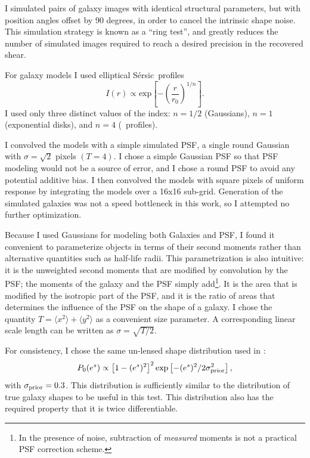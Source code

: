 \documentclass[12pt,preprint]{aastex}
\newcommand{\sersic}{S\'{e}rsic}
\begin{document}
I simulated pairs of galaxy images with identical structural parameters, but
with position angles offset by 90 degrees, in order to cancel the intrinsic
shape noise.  This simulation strategy is known as a ``ring
test''\citep{Nakajima2007}, and greatly reduces the number of simulated images
required to reach a desired precision in the recovered shear.

For galaxy models I used elliptical \sersic\ profiles \citep{Sersic63}
\begin{equation}
I(r) \varpropto \mathrm{exp} \left[ -\left( \frac{r}{r_0} \right)^{1/n} \right].
\end{equation}
I used only three distinct values of the index: $n=1/2$ (Gaussians), $n=1$ (exponential
disks), and $n=4$ (\devauc\ profiles).

I convolved the models with a simple simulated PSF, a single round Gaussian
with $\sigma = \sqrt{2}$ pixels $(T=4)$.  I chose a simple Gaussian PSF so that
PSF modeling would not be a source of error, and I chose a round PSF to avoid
any potential additive bias.  I then convolved the models with square pixels of
uniform response by integrating the models over a 16x16 sub-grid.  Generation
of the simulated galaxies was not a speed bottleneck in this work, so I
attempted no further optimization.

Because I used Gaussians for modeling both Galaxies and PSF, I found it
convenient to parameterize objects in terms of their second moments rather than
alternative quantities such as half-life radii.  This parametrization is also
intuitive: it is the unweighted second moments that are modified by convolution
by the PSF; the moments of the galaxy and the PSF simply add\footnote{In the
presence of noise, subtraction of {\it measured} moments is not a practical PSF
correction scheme.}.  It is the area that is modified by the isotropic part of
the PSF, and it is the ratio of areas that determines the influence of the PSF
on the shape of a galaxy.  I chose the quantity $T = \langle x^2 \rangle +
\langle y^2 \rangle$ as a convenient size parameter.  A corresponding linear
scale length can be written as $\sigma = \sqrt{T/2}$.

For consistency, I chose the same un-lensed shape distribution
used in \cite{ba14}:
\begin{equation}
P_0(e^s)\propto \left[1-(e^s)^2\right]^2 \exp\left[-(e^s)^2/2\sigma_{\rm prior}^2\right],
\end{equation}
with $\sigma_{\rm prior}=0.3$. This distribution is sufficiently similar to the
distribution of true galaxy shapes to be useful in this test.  This
distribution also has the required property that it is twice differentiable.
\end{document}
